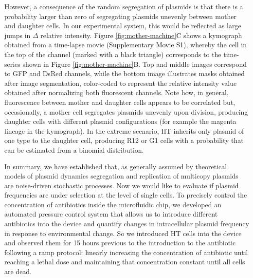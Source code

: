 \documentclass[fleqn,12pt]{wlscirep}
\newcommand{\fig}[1]{\textcolor{black}{#1}}
\begin{document}
However, a consequence of the random segregation of plasmids is that there is a probability larger than zero of segregating plasmids unevenly between mother and daughter cells. In our experimental system, this would be reflected as large jumps in $\Delta$ relative intensity.  \fig{Figure \ref{fig:mother-machine}C} shows a kymograph obtained from a time-lapse movie (\fig{Supplementary Movie S1}), whereby the cell in the top of the channel (marked with a black triangle) corresponds to the time-series shown in \fig{Figure \ref{fig:mother-machine}B}.  Top and middle images correspond to GFP and DsRed channels, while the bottom image illustrates masks obtained after image segmentation, color-coded to represent the relative intensity value obtained after normalizing both fluorescent channels.  Note how, in general, fluorescence between mother and daughter cells appears to be correlated but, occasionally, a mother cell segregates plasmids unevenly upon division, producing daughter cells with different plasmid configurations (for example the magenta lineage in the kymograph). In the extreme scenario, HT inherits only plasmid of one type to the daughter cell, producing R12 or G1 cells with a probability that can be estimated from a binomial distribution. 

In summary, we have established that, as generally assumed by theoretical models of plasmid dynamics \cite{Ilhan2019,santer2019evolutionary,SanMillan2014,Rodriguez2018} segregation and replication of multicopy plasmids are noise-driven stochastic processes. Now we would like to evaluate if plasmid frequencies are under selection at the level of single cells.
To precisely control the concentration of antibiotics inside the microfluidic chip, we developed an automated pressure control system\cite{Ferry2011} that allows us to introduce different antibiotics into the device and quantify changes in intracellular plasmid frequency in response to environmental change.
So we introduced HT cells into the device and observed them for 15 hours previous to the introduction to the antibiotic following a ramp protocol: linearly increasing the concentration of antibiotic until reaching a lethal dose and maintaining that concentration constant until all cells are dead. 
\end{document}
